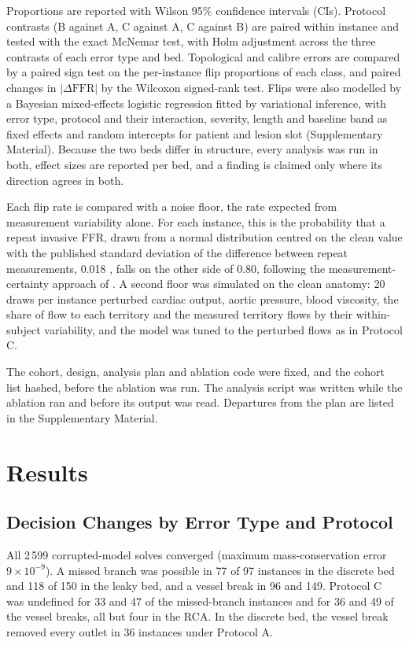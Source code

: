 \documentclass[journal]{IEEEtran}
\begin{document}
Proportions are reported with Wilson 95\% confidence intervals (CIs). Protocol contrasts (B against A, C against A,
C against B) are paired within instance and tested with the exact McNemar test, with Holm adjustment across the
three contrasts of each error type and bed. Topological and calibre errors are compared by a paired sign test on
the per-instance flip proportions of each class, and paired changes in $|\Delta\mathrm{FFR}|$ by the Wilcoxon
signed-rank test. Flips were also modelled by a Bayesian mixed-effects logistic regression fitted by variational
inference, with error type, protocol and their interaction, severity, length and baseline band as fixed effects and
random intercepts for patient and lesion slot (Supplementary Material). Because the two beds differ in structure,
every analysis was run in both, effect sizes are reported per bed, and a finding is claimed only where its
direction agrees in both.

Each flip rate is compared with a noise floor, the rate expected from measurement variability alone. For each instance, this is the probability that a repeat invasive FFR, drawn from a normal
distribution centred on the clean value with the published standard deviation of the difference between repeat measurements, 0.018 \cite{johnson2015}, falls on the other side of 0.80, following the measurement-certainty approach of \cite{petraco2013}. A second floor was simulated on the clean anatomy: 20 draws
per instance perturbed cardiac output, aortic pressure, blood viscosity, the share of flow to each territory and the
measured territory flows by their within-subject variability, and the model was tuned to the perturbed flows as in
Protocol C.

The cohort, design, analysis plan and ablation code were fixed, and the cohort list hashed, before the ablation was
run. The analysis script was written while the ablation ran and before its output was read. Departures from the
plan are listed in the Supplementary Material.

\section{Results}
\subsection{Decision Changes by Error Type and Protocol}
All 2\,599 corrupted-model solves converged (maximum mass-conservation error $9\times10^{-9}$). A missed branch
was possible in 77 of 97 instances in the discrete bed and 118
of 150 in the leaky bed, and a vessel break in 96 and 149. Protocol C was undefined for 33 and 47 of the
missed-branch instances and for 36 and 49 of the vessel breaks, all but four in the RCA. In the discrete bed, the
vessel break removed every outlet in 36 instances under Protocol A.
\end{document}
